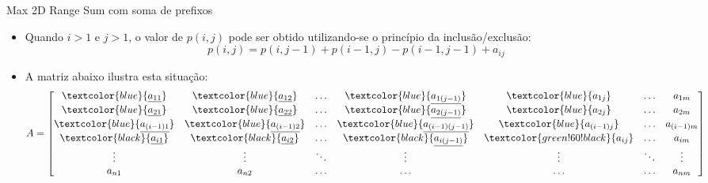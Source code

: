\begin{frame}[fragile]{Max 2D Range Sum com soma de prefixos}

    \begin{itemize}
        \item Quando $i > 1$ e $j > 1$, o valor de $p(i, j)$ pode ser obtido utilizando-se o
            princípio da inclusão/exclusão:
        \[
            p(i, j) = p(i, j - 1) + p(i - 1, j) - p(i - 1, j - 1) + a_{ij}
        \]
        
        \item A matriz abaixo ilustra esta situação:
        \[
            A = \begin{bmatrix}
                    \textcolor{blue}{\underline{a_{11}}} & \textcolor{blue}{\underline{a_{12}}} &
                        \ldots & \textcolor{blue}{\underline{a_{1(j - 1)}}} & \textcolor{blue}{a_{1j}} & \ldots & a_{1m} \\
                    \textcolor{blue}{\underline{a_{21}}} & \textcolor{blue}{\underline{a_{22}}} &
                        \ldots & \textcolor{blue}{\underline{a_{2(j - 1)}}} & \textcolor{blue}{a_{2j}} & \ldots & a_{2m} \\
                    \textcolor{blue}{\underline{a_{(i - 1)1}}} & \textcolor{blue}{\underline{a_{(i - 1)2}}} &
                        \ldots & \textcolor{blue}{\underline{a_{(i - 1)(j - 1)}}} & \textcolor{blue}{a_{(i - 1)j}} & \ldots & a_{(i - 1)m} \\
                    \textcolor{black}{\underline{a_{i1}}} & \textcolor{black}{\underline{a_{i2}}} &
                        \ldots & \textcolor{black}{\underline{a_{i(j - 1)}}} & \textcolor{green!60!black}{a_{ij}} & \ldots & a_{im} \\
                \vdots & \vdots & \ddots & \vdots & \vdots & \ddots & \vdots \\
                a_{n1} & a_{n2} & \ldots & \ldots & \ldots & \ldots & a_{nm} \\
                \end{bmatrix}
        \]
    \end{itemize}

\end{frame}

